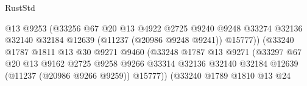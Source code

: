 \begin{lexlean}{RustStd}
\begin{coremodule}
                                              @13
                                              @9253
                                              (@33256
                                                @67
                                                @20
                                                @13
                                                @4922
                                                @2725
                                                @9240
                                                @9248
                                                @33274
                                                @32136
                                                @32140
                                                @32184
                                                @12639
                                                (@11237 (@20986 @9248 @9241))
                                                @15777))
                                            (@33240
                                              @1787
                                              @1811
                                              @13
                                              @30
                                              @9271
                                              @9460
                                              (@33248
                                                @1787
                                                @13
                                                @9271
                                                (@33297
                                                  @67
                                                  @20
                                                  @13
                                                  @9162
                                                  @2725
                                                  @9258
                                                  @9266
                                                  @33314
                                                  @32136
                                                  @32140
                                                  @32184
                                                  @12639
                                                  (@11237 (@20986 @9266 @9259))
                                                  @15777))
                                              (@33240
                                                @1789
                                                @1810
                                                @13
                                                @24

\end{coremodule}
\end{lexlean}
